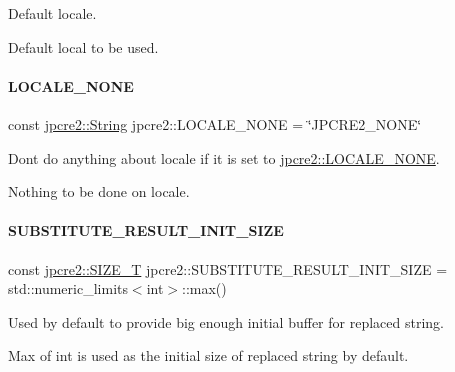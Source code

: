 Default locale. 

Default local to be used. \hypertarget{namespacejpcre2_ad2236dcdcc14d580724b256ce7f168e5_ad2236dcdcc14d580724b256ce7f168e5}{}\label{namespacejpcre2_ad2236dcdcc14d580724b256ce7f168e5_ad2236dcdcc14d580724b256ce7f168e5} 
\paragraph{\texorpdfstring{L\+O\+C\+A\+L\+E\+\_\+\+N\+O\+NE}{LOCALE\_NONE}}
{\footnotesize\ttfamily const \hyperlink{namespacejpcre2_a91f03070152fb228bc116c5a737f1d16}{jpcre2\+::\+String} jpcre2\+::\+L\+O\+C\+A\+L\+E\+\_\+\+N\+O\+NE = \char`\"{}J\+P\+C\+R\+E2\+\_\+\+N\+O\+NE\char`\"{}}



Don\textquotesingle{}t do anything about locale if it is set to \hyperlink{namespacejpcre2_ad2236dcdcc14d580724b256ce7f168e5_ad2236dcdcc14d580724b256ce7f168e5}{jpcre2\+::\+L\+O\+C\+A\+L\+E\+\_\+\+N\+O\+NE}. 

Nothing to be done on locale. \hypertarget{namespacejpcre2_a80cb201f2e733137b22a8ed98465096a_a80cb201f2e733137b22a8ed98465096a}{}\label{namespacejpcre2_a80cb201f2e733137b22a8ed98465096a_a80cb201f2e733137b22a8ed98465096a} 
\paragraph{\texorpdfstring{S\+U\+B\+S\+T\+I\+T\+U\+T\+E\+\_\+\+R\+E\+S\+U\+L\+T\+\_\+\+I\+N\+I\+T\+\_\+\+S\+I\+ZE}{SUBSTITUTE\_RESULT\_INIT\_SIZE}}
{\footnotesize\ttfamily const \hyperlink{namespacejpcre2_a2aac465ddcb123560c7c8215dd69246c}{jpcre2\+::\+S\+I\+Z\+E\+\_\+T} jpcre2\+::\+S\+U\+B\+S\+T\+I\+T\+U\+T\+E\+\_\+\+R\+E\+S\+U\+L\+T\+\_\+\+I\+N\+I\+T\+\_\+\+S\+I\+ZE = std\+::numeric\+\_\+limits$<$int$>$\+::max()}



Used by default to provide big enough initial buffer for replaced string. 

Max of {\ttfamily int} is used as the initial size of replaced string by default. 